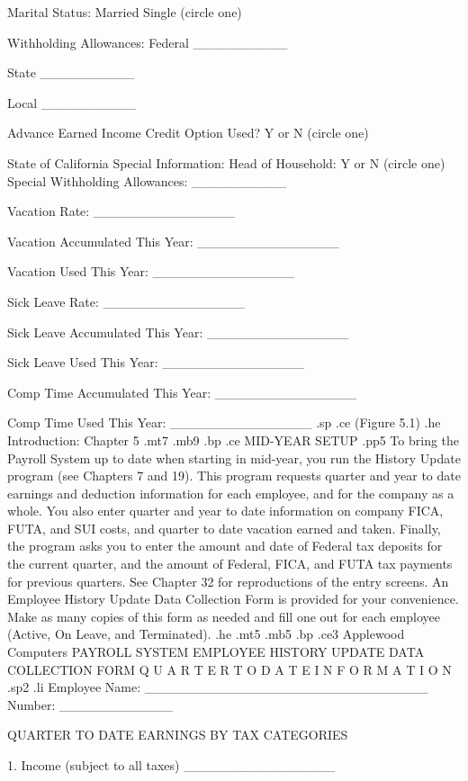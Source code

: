 Marital Status:   Married    Single    (circle one)

Withholding Allowances:   Federal __________

			  State   __________

			  Local   __________

Advance Earned Income Credit Option Used?   Y	or   N	(circle one)

State of California Special Information:
	   Head of Household:	 Y   or   N   (circle one)
	   Special Withholding Allowances: __________

Vacation Rate:	_______________

Vacation Accumulated This Year:  _______________

Vacation Used This Year:  _______________

Sick Leave Rate:  _______________

Sick Leave Accumulated This Year:  _______________

Sick Leave Used This Year:  _______________

Comp Time Accumulated This Year:  _______________

Comp Time Used This Year:  _______________
.sp
.ce
(Figure 5.1)
.he Introduction: Chapter 5
.mt7
.mb9
.bp
.ce
MID-YEAR SETUP
.pp5
To bring the Payroll System up to date when starting in mid-year, you
run the History Update program (see Chapters 7 and 19).  This program
requests quarter and year to date earnings and deduction information
for each employee, and for the company as a whole.  You also enter
quarter and year to date information on company FICA, FUTA, and SUI
costs, and quarter to date vacation earned and taken.  Finally, the
program asks you to enter the amount and date of Federal
tax deposits for the current quarter, and the amount of Federal,
FICA, and FUTA tax payments for previous quarters.  See Chapter 32
for reproductions of the entry screens.  An Employee History Update Data
Collection Form is provided for your convenience.  Make as many copies
of this form as needed and fill one out for each employee (Active,
On Leave, and Terminated).
.he
.mt5
.mb5
.bp
.ce3
Applewood Computers PAYROLL SYSTEM
EMPLOYEE HISTORY UPDATE DATA COLLECTION FORM
Q U A R T E R	 T O	D A T E    I N F O R M A T I O N
.sp2
.li
Employee Name: ______________________________  Number: ____________



	  QUARTER TO DATE EARNINGS BY TAX CATEGORIES

1. Income (subject to all taxes)		   ________________

